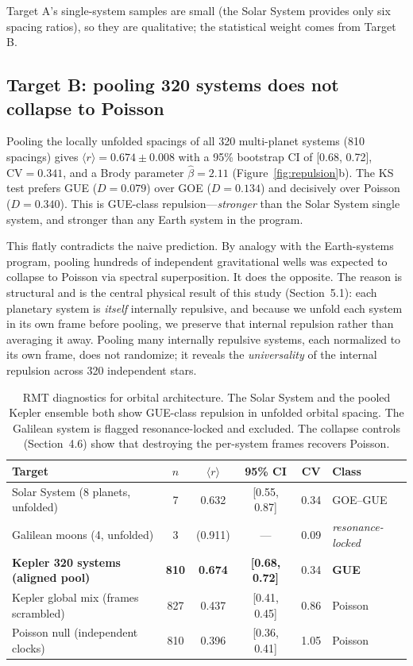 \documentclass[12pt,a4paper]{article}
\begin{document}
Target A's single-system samples are small (the Solar System provides only six spacing ratios), so they are qualitative; the statistical weight comes from Target B.

\subsection{Target B: pooling 320 systems does not collapse to Poisson}

Pooling the locally unfolded spacings of all 320 multi-planet systems (810 spacings) gives $\langle r\rangle=0.674\pm0.008$ with a 95\% bootstrap CI of [0.68, 0.72], $\mathrm{CV}=0.341$, and a Brody parameter $\hat\beta=2.11$ (Figure~\ref{fig:repulsion}b). The KS test prefers GUE ($D=0.079$) over GOE ($D=0.134$) and decisively over Poisson ($D=0.340$). This is GUE-class repulsion---\emph{stronger} than the Solar System single system, and stronger than any Earth system in the program.

This flatly contradicts the naive prediction. By analogy with the Earth-systems program, pooling hundreds of independent gravitational wells was expected to collapse to Poisson via spectral superposition. It does the opposite. The reason is structural and is the central physical result of this study (Section~5.1): each planetary system is \emph{itself} internally repulsive, and because we unfold each system in its own frame before pooling, we preserve that internal repulsion rather than averaging it away. Pooling many internally repulsive systems, each normalized to its own frame, does not randomize; it reveals the \emph{universality} of the internal repulsion across 320 independent stars.

\begin{table}[H]
\centering
\caption{RMT diagnostics for orbital architecture. The Solar System and the pooled Kepler ensemble both show GUE-class repulsion in unfolded orbital spacing. The Galilean system is flagged resonance-locked and excluded. The collapse controls (Section~4.6) show that destroying the per-system frames recovers Poisson.}
\label{tab:main}
\small
\begin{tabular}{lccccl}
\toprule
Target & $n$ & $\langle r\rangle$ & 95\% CI & CV & Class \\
\midrule
Solar System (8 planets, unfolded) & 7 & 0.632 & [0.55, 0.87] & 0.34 & GOE--GUE \\
Galilean moons (4, unfolded) & 3 & (0.911) & --- & 0.09 & \emph{resonance-locked} \\
\textbf{Kepler 320 systems (aligned pool)} & \textbf{810} & \textbf{0.674} & \textbf{[0.68, 0.72]} & 0.34 & \textbf{GUE} \\
\midrule
Kepler global mix (frames scrambled) & 827 & 0.437 & [0.41, 0.45] & 0.86 & Poisson \\
Poisson null (independent clocks) & 810 & 0.396 & [0.36, 0.41] & 1.05 & Poisson \\
\bottomrule
\end{tabular}
\end{table}
\end{document}
